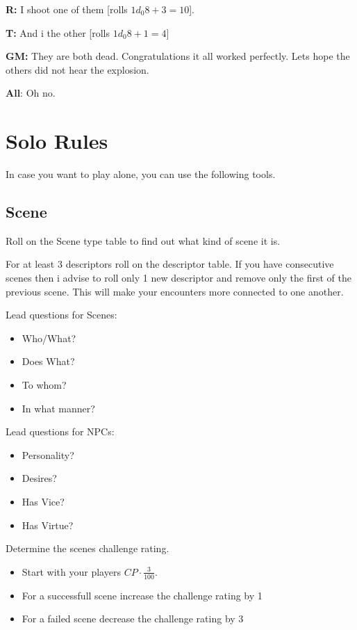 \documentclass[11pt]{article}
\begin{document}
{\textbf{R:} I shoot one of them [rolls \(1 d_0 8 + 3 = 10\)].

\textbf{T:} And i the other [rolls \(1 d_0 8 + 1 = 4\)]

\textbf{GM:} They are both dead. Congratulations it all worked perfectly. Lets hope the others did not hear the explosion.

\textbf{All}: Oh no.


\newpage
\section{Solo Rules}
\label{sec:org4e384b0}
In case you want to play alone, you can use the following tools.
\subsection{Scene}
\label{sec:orgc6bd115}
Roll on the Scene type table to find out what kind of scene it is.

For at least 3 descriptors roll on the descriptor table. If you have consecutive scenes then i advise to roll only 1 new descriptor and remove only the first of the previous scene. This will make your encounters more connected to one another.

\begin{multicols}{2}
Lead questions for Scenes: 
\begin{itemize}
\item Who/What?
\item Does What?
\item To whom?
\item In what manner?
\end{itemize}
\columnbreak
Lead questions for NPCs:
\begin{itemize}
\item Personality?
\item Desires?
\item Has Vice?
\item Has Virtue?
\end{itemize}
\end{multicols}

Determine the scenes challenge rating.
\begin{itemize}
\item Start with your players \(CP \cdot \frac{3}{100}\).
\item For a successfull scene increase the challenge rating by 1
\item For a failed scene decrease the challenge rating by 3
\end{itemize}

}
\end{document}
